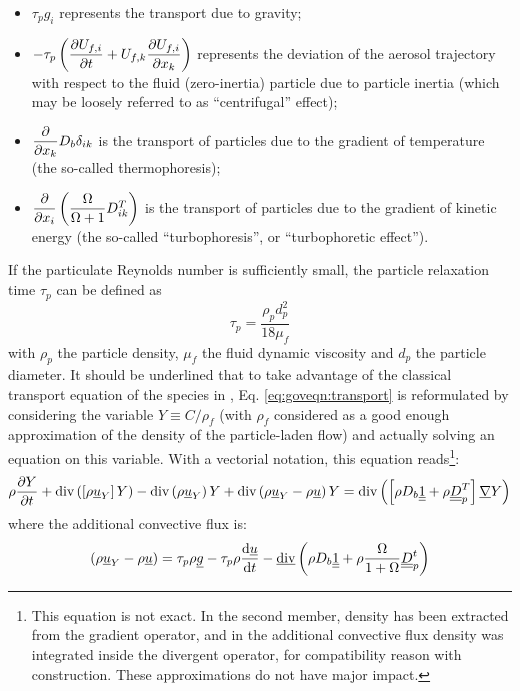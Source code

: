 \begin{itemize}
 \item $\tau_p g_i$ represents the transport due to gravity;
 \item $-\tau_p \left(\dfrac{\partial U_{f,i}}{\partial t} + U_{f,k}\dfrac{\partial U_{f,i}}{\partial x_k}\right)$ represents the
       deviation of the aerosol trajectory with respect to the fluid (zero-inertia) particle
       due to particle inertia (which may be loosely referred to as ``centrifugal'' effect);
 \item $\dfrac{\partial }{\partial x_k}D_b\delta_{ik}$ is the transport of particles due to the gradient of
   temperature (the so-called thermophoresis);
 \item $\dfrac{\partial }{\partial x_i}\left(\dfrac{\Omega}{\Omega+1}D^T_{ik}\right)$ is the transport of particles
   due to the gradient of kinetic energy (the so-called ``turbophoresis'', or
   ``turbophoretic effect'').
\end{itemize}
If the particulate Reynolds number is sufficiently small, the particle relaxation time $\tau_p$
can be defined as
\begin{equation}\label{eq:goveqn:taup}
  \tau_p = \dfrac{\rho_pd_p^2}{18\mu_f}
\end{equation}
with $\rho_p$ the particle density, $\mu_f$ the fluid dynamic viscosity and $d_p$ the particle
diameter.
It should be underlined that to take advantage of the classical transport equation of the
species in \CS, Eq. \eqref{eq:goveqn:transport} is reformulated by considering the variable
$Y\equiv C/\rho_f$ (with $\rho_f$ considered as a good enough approximation of the density of
the particle-laden flow) and actually solving an equation on this variable.
With a vectorial notation, this equation reads\footnote{This equation is not exact. In the second member, density has been extracted from the gradient operator, and in the additional convective flux density was integrated inside the divergent operator, for compatibility reason with \CS construction. These approximations do not have major impact.}:
\begin{eqnarray}\label{eq:goveqn:transportY}
  \rho\dfrac{\partial Y}{\partial t} + \textrm{div}\left(\left[\rho \underline{u}_Y\right]Y\right)
  -\textrm{div}\left(\rho \underline{u}_Y\right)Y
  +\textrm{div}\left(\rho \underline{u}_Y-\rho\underline{u}\right)Y =
  \textrm{div}\left(\left[\rho D_b \underline{\underline{{1}}} + \rho\underline{\underline{{D}}}_p^T\right]\underline{\nabla}Y\right)
\end{eqnarray}
where the additional convective flux is:
\begin{equation}\label{eq:goveqn:flux}
 \left(\rho \underline{u}_Y-\rho\underline{u}\right) = \tau_p \rho \underline{g}
 - \tau_p\rho \dfrac{\mathrm{d}\underline{u}}{\mathrm{d} t}
 - \underline{\textrm{div}}\left(\rho D_b \underline{\underline{{1}}} + \rho\dfrac{\Omega}{1+\Omega}\underline{\underline{{D}}}_p^t\right)
\end{equation}

